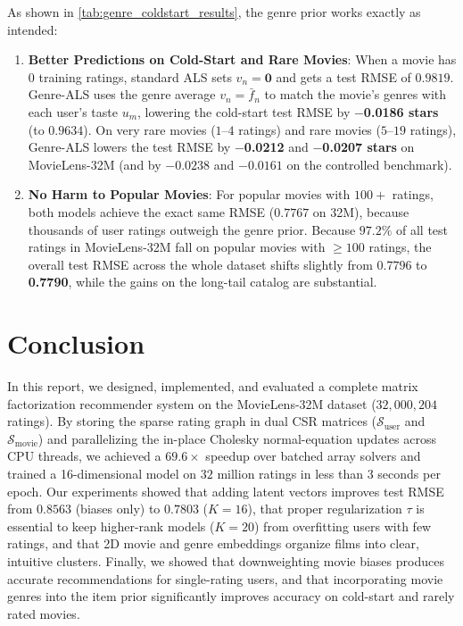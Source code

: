 \documentclass{article}
\theoremstyle{plain}
\theoremstyle{definition}
\begin{document}
As shown in \cref{tab:genre_coldstart_results}, the genre prior works exactly as intended:
\begin{enumerate}
    \item \textbf{Better Predictions on Cold-Start and Rare Movies}: When a movie has $0$ training ratings, standard ALS sets $v_n = \mathbf{0}$ and gets a test RMSE of $0.9819$. Genre-ALS uses the genre average $v_n = \bar{f}_n$ to match the movie's genres with each user's taste $u_m$, lowering the cold-start test RMSE by \textbf{$-$0.0186 stars} (to $0.9634$). On very rare movies ($1\text{--}4$ ratings) and rare movies ($5\text{--}19$ ratings), Genre-ALS lowers the test RMSE by \textbf{$-$0.0212} and \textbf{$-$0.0207 stars} on MovieLens-32M (and by $-0.0238$ and $-0.0161$ on the controlled benchmark).
    \item \textbf{No Harm to Popular Movies}: For popular movies with $100+$ ratings, both models achieve the exact same RMSE ($0.7767$ on 32M), because thousands of user ratings outweigh the genre prior. Because $97.2\%$ of all test ratings in MovieLens-32M fall on popular movies with $\ge 100$ ratings, the overall test RMSE across the whole dataset shifts slightly from $0.7796$ to \textbf{0.7790}, while the gains on the long-tail catalog are substantial.
\end{enumerate}

\section{Conclusion}
\label{sec:conclusion}

In this report, we designed, implemented, and evaluated a complete matrix factorization recommender system on the MovieLens-32M dataset ($32{,}000{,}204$ ratings). By storing the sparse rating graph in dual CSR matrices ($\mathcal{S}_{\text{user}}$ and $\mathcal{S}_{\text{movie}}$) and parallelizing the in-place Cholesky normal-equation updates across CPU threads, we achieved a $69.6\times$ speedup over batched array solvers and trained a 16-dimensional model on $32$ million ratings in less than $3$ seconds per epoch. Our experiments showed that adding latent vectors improves test RMSE from $0.8563$ (biases only) to $0.7803$ ($K=16$), that proper regularization $\tau$ is essential to keep higher-rank models ($K=20$) from overfitting users with few ratings, and that 2D movie and genre embeddings organize films into clear, intuitive clusters. Finally, we showed that downweighting movie biases produces accurate recommendations for single-rating users, and that incorporating movie genres into the item prior significantly improves accuracy on cold-start and rarely rated movies.
\end{document}
